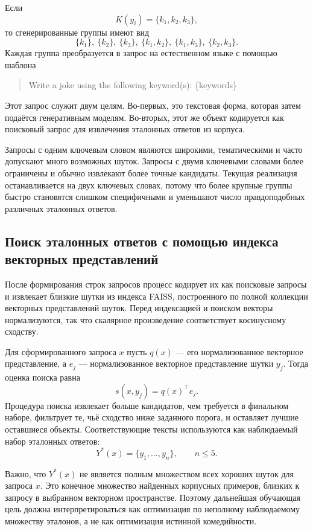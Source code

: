 Если
\[
    K(y_i)=\{k_1,k_2,k_3\},
\]
то сгенерированные группы имеют вид
\[
    \{k_1\},\ \{k_2\},\ \{k_3\},\ \{k_1,k_2\},\ \{k_1,k_3\},\ \{k_2,k_3\}.
\]
Каждая группа преобразуется в запрос на естественном языке с помощью шаблона
\begin{quote}
    \ttfamily Write a joke using the following keyword(s): \{keywords\}
\end{quote}
Этот запрос служит двум целям. Во-первых, это текстовая форма, которая затем подаётся генеративным моделям. Во-вторых, этот же объект кодируется как поисковый запрос для извлечения эталонных ответов из корпуса.

Запросы с одним ключевым словом являются широкими, тематическими и часто допускают много возможных шуток. Запросы с двумя ключевыми словами более ограничены и обычно извлекают более точные кандидаты. Текущая реализация останавливается на двух ключевых словах, потому что более крупные группы быстро становятся слишком специфичными и уменьшают число правдоподобных различных эталонных ответов.

\subsection{Поиск эталонных ответов с помощью индекса векторных представлений}

После формирования строк запросов процесс кодирует их как поисковые запросы и извлекает близкие шутки из индекса FAISS, построенного по полной коллекции векторных представлений шуток. Перед индексацией и поиском векторы нормализуются, так что скалярное произведение соответствует косинусному сходству.

Для сформированного запроса \(x\) пусть \(q(x)\) --- его нормализованное векторное представление, а \(e_j\) --- нормализованное векторное представление шутки \(y_j\). Тогда оценка поиска равна
\[
    s(x,y_j)=q(x)^\top e_j.
\]
Процедура поиска извлекает больше кандидатов, чем требуется в финальном наборе, фильтрует те, чьё сходство ниже заданного порога, и оставляет лучшие оставшиеся объекты. Соответствующие тексты используются как наблюдаемый набор эталонных ответов:
\[
    Y^{*}(x)=\{y_1,\dots,y_n\},
    \qquad
    n\le 5.
\]

Важно, что \(Y^{*}(x)\) не является полным множеством всех хороших шуток для запроса \(x\). Это конечное множество найденных корпусных примеров, близких к запросу в выбранном векторном пространстве. Поэтому дальнейшая обучающая цель должна интерпретироваться как оптимизация по неполному наблюдаемому множеству эталонов, а не как оптимизация истинной комедийности.

